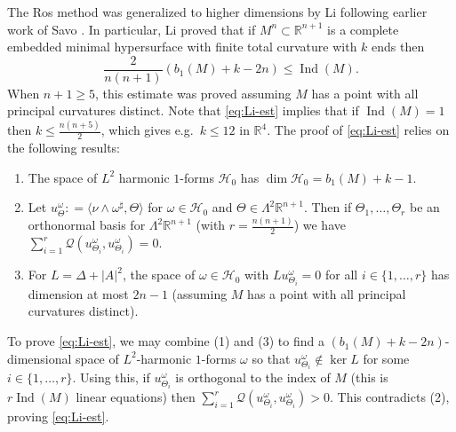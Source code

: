 \documentclass[11pt]{amsart}
\numberwithin{equation}{section}
\theoremstyle{plain}
\theoremstyle{definition}
\theoremstyle{remark}
\newcommand{\R}{\mathbb{R}}
\DeclareMathOperator{\Ind}{Ind}
\newcommand{\Hzero}{\mathcal H_0}
\newcommand{\Qcal}{\mathcal Q}
\newcommand{\bangle}[1]{\langle #1 \rangle}
\begin{document}
The Ros method was generalized to higher dimensions by Li \cite{Li2017} following earlier work of Savo \cite{Savo2010}. In particular, Li proved that if $M^n\subset\R^{n+1}$ is a complete embedded minimal hypersurface with finite total curvature with $k$ ends then
\begin{equation}\label{eq:Li-est}
\frac{2}{n(n+1)}(b_1(M) + k - 2n) \leq \Ind(M). 
\end{equation}
When $n+1\geq 5$, this estimate was proved assuming $M$ has a point with all principal curvatures distinct. Note that \eqref{eq:Li-est} implies that if $\Ind(M) = 1$ then $k \leq \frac{n(n+5)}{2}$, which gives e.g.\ $k\leq 12$ in $\R^4$. The proof of \eqref{eq:Li-est} relies on the following results:
\begin{enumerate}
\item The space of $L^2$ harmonic $1$-forms $\Hzero$ has $\dim \Hzero = b_1({M}) + k-1$. 
\item Let $u^\omega_{\Theta} : = \bangle{\nu \wedge \omega^\sharp,\Theta} $ for $\omega\in \Hzero$ and $\Theta \in \Lambda^2\R^{n+1}$. Then if $\Theta_1,\dots,\Theta_r$ be an orthonormal basis for $\Lambda^2\R^{n+1}$ (with $r = \frac{n(n+1)}{2}$) we have $\sum_{i=1}^r \Qcal(u^\omega_{\Theta_i},u^\omega_{\Theta_i}) = 0$. 
\item For $L = \Delta + |A|^2$, the space of $\omega\in \Hzero$ with $Lu^\omega_{\Theta_i} = 0$ for all $i\in\{1,\dots,r\}$ has dimension at most $2n - 1$ (assuming $M$ has a point with all principal curvatures distinct). 
\end{enumerate}
To prove \eqref{eq:Li-est}, we may combine (1) and (3) to find a $(b_1(M) + k - 2n )$-dimensional space of $L^2$-harmonic $1$-forms $\omega$ so that $u^\omega_{\Theta_i}\not \in \ker L$ for some $i\in\{1,\dots,r\}$. Using this, if $u^\omega_{\Theta_i}$ is orthogonal to the index of $M$ (this is $r \Ind(M)$ linear equations) then $\sum_{i=1}^r \Qcal(u^\omega_{\Theta_i},u^\omega_{\Theta_i}) > 0$. This contradicts (2), proving  \eqref{eq:Li-est}. 
\end{document}
